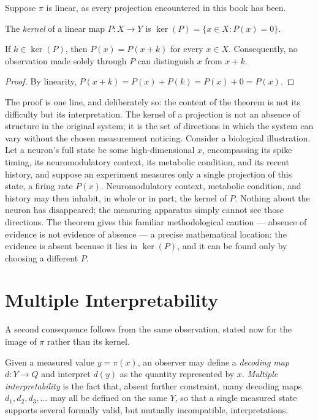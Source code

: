 Suppose $\pi$ is linear, as every projection encountered in this book has
been.

\begin{definition}
The \emph{kernel} of a linear map $P: X \to Y$ is $\ker(P) = \{x \in X :
P(x) = 0\}$.
\end{definition}

\begin{theorem}
If $k \in \ker(P)$, then $P(x) = P(x+k)$ for every $x \in X$. Consequently,
no observation made solely through $P$ can distinguish $x$ from $x+k$.
\end{theorem}

\begin{proof}
By linearity, $P(x+k) = P(x) + P(k) = P(x) + 0 = P(x)$.
\end{proof}

The proof is one line, and deliberately so: the content of the theorem is
not its difficulty but its interpretation. The kernel of a projection is
not an absence of structure in the original system; it is the set of
directions in which the system can vary without the chosen measurement
noticing. Consider a biological illustration. Let a neuron's full state
be some high-dimensional $x$, encompassing its spike timing, its
neuromodulatory context, its metabolic condition, and its recent history,
and suppose an experiment measures only a single projection of this
state, a firing rate $P(x)$. Neuromodulatory context, metabolic
condition, and history may then inhabit, in whole or in part, the kernel
of $P$. Nothing about the neuron has disappeared; the measuring apparatus
simply cannot see those directions. The theorem gives this familiar
methodological caution --- absence of evidence is not evidence of absence
--- a precise mathematical location: the evidence is absent because it
lies in $\ker(P)$, and it can be found only by choosing a different $P$.

\section{Multiple Interpretability}

A second consequence follows from the same observation, stated now for the
image of $\pi$ rather than its kernel.

\begin{definition}
Given a measured value $y = \pi(x)$, an observer may define a
\emph{decoding map} $d: Y \to Q$ and interpret $d(y)$ as the quantity
represented by $x$. \emph{Multiple interpretability} is the fact that,
absent further constraint, many decoding maps $d_1, d_2, d_3, \dots$ may
all be defined on the same $Y$, so that a single measured state supports
several formally valid, but mutually incompatible, interpretations.
\end{definition}

